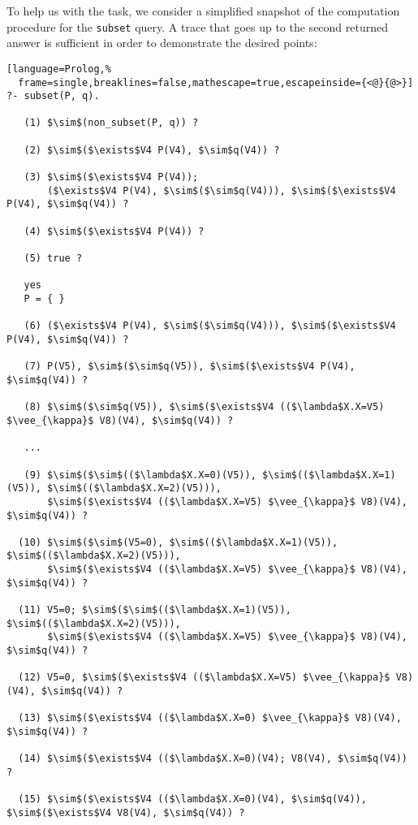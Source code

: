 \documentclass[inscr,ack,preface]{dithesis}
\theoremstyle{definition}
\begin{document}
To help us with the task, we consider a simplified snapshot of the computation procedure for the \texttt{subset} query. A trace that goes up to the second returned answer is sufficient in order to demonstrate the desired points:
\\
\begin{lstlisting}[language=Prolog,%
  frame=single,breaklines=false,mathescape=true,escapeinside={<@}{@>}]
?- subset(P, q).

   (1) $\sim$(non_subset(P, q)) ?

   (2) $\sim$($\exists$V4 P(V4), $\sim$q(V4)) ?

   (3) $\sim$($\exists$V4 P(V4));
       ($\exists$V4 P(V4), $\sim$($\sim$q(V4))), $\sim$($\exists$V4 P(V4), $\sim$q(V4)) ?

   (4) $\sim$($\exists$V4 P(V4)) ?

   (5) true ?

   yes
   P = { }

   (6) ($\exists$V4 P(V4), $\sim$($\sim$q(V4))), $\sim$($\exists$V4 P(V4), $\sim$q(V4)) ?

   (7) P(V5), $\sim$($\sim$q(V5)), $\sim$($\exists$V4 P(V4), $\sim$q(V4)) ?

   (8) $\sim$($\sim$q(V5)), $\sim$($\exists$V4 (($\lambda$X.X=V5) $\vee_{\kappa}$ V8)(V4), $\sim$q(V4)) ?

   ...

   (9) $\sim$($\sim$(($\lambda$X.X=0)(V5)), $\sim$(($\lambda$X.X=1)(V5)), $\sim$(($\lambda$X.X=2)(V5))),
       $\sim$($\exists$V4 (($\lambda$X.X=V5) $\vee_{\kappa}$ V8)(V4), $\sim$q(V4)) ?

  (10) $\sim$($\sim$(V5=0), $\sim$(($\lambda$X.X=1)(V5)), $\sim$(($\lambda$X.X=2)(V5))),
       $\sim$($\exists$V4 (($\lambda$X.X=V5) $\vee_{\kappa}$ V8)(V4), $\sim$q(V4)) ?

  (11) V5=0; $\sim$($\sim$(($\lambda$X.X=1)(V5)), $\sim$(($\lambda$X.X=2)(V5))),
       $\sim$($\exists$V4 (($\lambda$X.X=V5) $\vee_{\kappa}$ V8)(V4), $\sim$q(V4)) ?

  (12) V5=0, $\sim$($\exists$V4 (($\lambda$X.X=V5) $\vee_{\kappa}$ V8)(V4), $\sim$q(V4)) ?

  (13) $\sim$($\exists$V4 (($\lambda$X.X=0) $\vee_{\kappa}$ V8)(V4), $\sim$q(V4)) ?

  (14) $\sim$($\exists$V4 (($\lambda$X.X=0)(V4); V8(V4), $\sim$q(V4)) ?

  (15) $\sim$($\exists$V4 (($\lambda$X.X=0)(V4), $\sim$q(V4)), $\sim$($\exists$V4 V8(V4), $\sim$q(V4)) ?


\end{lstlisting}
\end{document}
